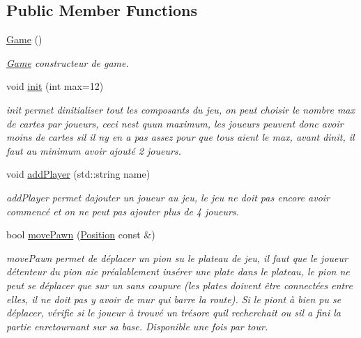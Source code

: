 \subsection*{Public Member Functions}
\begin{DoxyCompactItemize}
\item 
\mbox{\label{class_game_ad59df6562a58a614fda24622d3715b65}} 
\mbox{\hyperlink{class_game_ad59df6562a58a614fda24622d3715b65}{Game}} ()
\begin{DoxyCompactList}\small\item\em \mbox{\hyperlink{class_game}{Game}} constructeur de game. \end{DoxyCompactList}\item 
void \mbox{\hyperlink{class_game_af7453615da19dfb6d9646bf33acccccb}{init}} (int max=12)
\begin{DoxyCompactList}\small\item\em init permet d\textquotesingle{}initialiser tout les composants du jeu, on peut choisir le nombre max de cartes par joueurs, ceci n\textquotesingle{}est qu\textquotesingle{}un maximum, les joueurs peuvent donc avoir moins de cartes s\textquotesingle{}il il n\textquotesingle{}y en a pas assez pour que tous aient le max, avant d\textquotesingle{}init, il faut au minimum avoir ajouté 2 joueurs. \end{DoxyCompactList}\item 
void \mbox{\hyperlink{class_game_a99198ff9faa792eeea8b24435e34cd6d}{add\+Player}} (std\+::string name)
\begin{DoxyCompactList}\small\item\em add\+Player permet d\textquotesingle{}ajouter un joueur au jeu, le jeu ne doit pas encore avoir commencé et on ne peut pas ajouter plus de 4 joueurs. \end{DoxyCompactList}\item 
bool \mbox{\hyperlink{class_game_a972bf039217d747db1fd3487574a58a8}{move\+Pawn}} (\mbox{\hyperlink{class_position}{Position}} const \&)
\begin{DoxyCompactList}\small\item\em move\+Pawn permet de déplacer un pion su le plateau de jeu, il faut que le joueur détenteur du pion aie préalablement insérer une plate dans le plateau, le pion ne peut se déplacer que sur un sans coupure (les plates doivent être connectées entre elles, il ne doit pas y avoir de mur qui barre la route). Si le piont à bien pu se déplacer, vérifie si le joueur à trouvé un trésore qu\textquotesingle{}il recherchait ou s\textquotesingle{}il a fini la partie enretournant sur sa base. Disponible une fois par tour. \end{DoxyCompactList}\item 

\end{DoxyCompactItemize}
